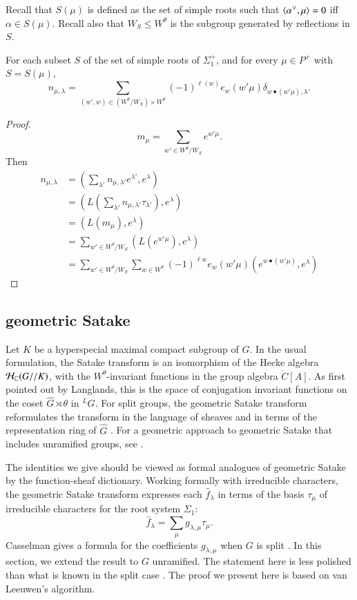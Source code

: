 Recall that $S(\mu)$ is defined as the set of simple roots such that
$\langle{\alpha^\vee,\mu}\rangle=0$ iff $\alpha\in S(\mu)$.  Recall also that
$W_S\le W^\theta$ is the subgroup generated by reflections in $S$.

\begin{lemma}  
  For each subset $S$ of the set of simple roots of $\Sigma^+_1$, and
  for every $\mu\in P^+$ with $S = S(\mu)$,
\[
n_{\mu,\lambda}=\sum_{(w',w)\in (W^\theta/W_S)\times W^\theta}
 (-1)^{\ell(w)} e_w(w'\mu) \delta_{w\bullet (w'\mu),\lambda}. 
\]
\end{lemma}

\begin{proof}  
\[
m_\mu = \sum_{w'\in W^\theta/W_S} e^{w' \mu}.
\]
Then
\begin{align*}
n_{\mu,\lambda} 
    &= (\sum_{\lambda'} n_{\mu,{\lambda'}} e^{\lambda'},e^\lambda) \\
     &= (L(\sum_{\lambda'} n_{\mu,\lambda'} \tau_{\lambda'}),e^\lambda) \\
     &= (L(m_\mu),e^\lambda) \\
     &= \sum_{w'\in W^\theta/W_S} (L(e^{w'\mu}),e^\lambda)\\
     &= \sum_{w'\in W^\theta/W_S} \sum_{w\in W^\theta} 
      (-1)^{\ell w} e_w(w'\mu) (e^{w\bullet (w'\mu)},e^\lambda)
\end{align*}
\end{proof}


\subsection{geometric Satake}

Let $K$ be a hyperspecial maximal compact subgroup of $G$.  In the
usual formulation, the Satake transform is an isomorphism of the Hecke
algebra $\mathcal H_{\mathbb{C}}(G//K)$, with the $W^\theta$-invariant functions
in the group algebra $\ring{C}[A]$.  As first pointed out by
Langlands, this is the space of conjugation invariant functions on the
coset $\hat G\rtimes \theta$ in ${}^LG$.  For split groups, the
geometric Satake transform reformulates the transform in the language
of sheaves and in terms of the representation ring of $\hat G$
\cite{mirkovic2007geometric}.  For a geometric approach to geometric
Satake that includes unramified groups, see \cite{zhu2011geometric}.

The identities we give should be viewed as formal analogues of
geometric Satake by the function-sheaf
dictionary. %
Working formally with irreducible characters, the geometric Satake
transform expresses each $\hat f_\lambda$ in terms of the basis
$\tau_\mu$ of irreducible characters for the root system $\Sigma_1$:
\begin{equation}\label{eqn:geometric-satake}
\hat f_\lambda = \sum_\mu g_{\lambda,\mu} \tau_\mu.
\end{equation}
Casselman gives a formula for the coefficients $g_{\lambda,\mu}$ when
$G$ is split \cite{casymmetric}.  In this section, we extend the
result to $G$ unramified.  The statement here is less polished than
what is known in the split case \cite{casymmetric}.  The proof we
present here is based on van Leeuwen's algorithm.

